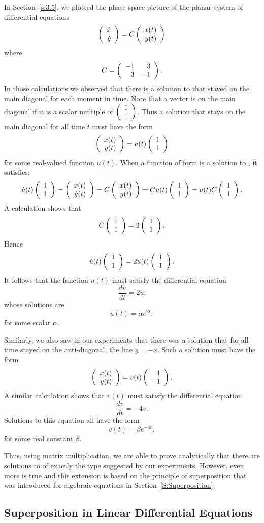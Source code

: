 \documentclass{ximera}
\begin{document}
In Section~\ref{s:3.5}, we plotted the phase space picture 
of the planar system of differential equations
\begin{equation} \label{-13}
\left(\begin{array}{r} \dot{x} \\ \dot{y}\end{array}\right)
= C \left(\begin{array}{r} x(t) \\ y(t)\end{array}\right)
\end{equation}
where
\[
C = \left(\begin{array}{rr} -1 & 3\\ 3 &-1\end{array}\right).
\]
In those calculations we observed that there is a solution to
 that stayed on the main diagonal for each moment in
time.  Note that a vector is on the main diagonal if it is a
scalar multiple of $\left(\begin{array}{r} 1 \\ 1\end{array}\right)$.  Thus a solution that stays
on the main diagonal for all time $t$ must have the form
\begin{equation} \label{e:diagform}
\left(\begin{array}{r} x(t) \\ y(t)\end{array}\right) = u(t) \left(\begin{array}{r} 1 \\ 1\end{array}\right)
\end{equation}
for some real-valued function $u(t)$.  When a function of form
 is a solution to , it satisfies:
\[
\dot{u}(t)\left(\begin{array}{r} 1 \\ 1\end{array}\right) = \left(\begin{array}{r} \dot{x}(t) \\ \dot{y}(t)\end{array}\right) =
C \left(\begin{array}{r} x(t) \\ y(t)\end{array}\right) = C u(t)\left(\begin{array}{r} 1 \\ 1\end{array}\right) = u(t) C \left(\begin{array}{r} 1 \\ 1\end{array}\right).
\]
A calculation shows that
\[
C \left(\begin{array}{r} 1 \\ 1\end{array}\right) = 2 \left(\begin{array}{r} 1 \\ 1\end{array}\right).
\]
Hence
\[
\dot{u}(t) \left(\begin{array}{r} 1 \\ 1\end{array}\right) =  2 u(t) \left(\begin{array}{r} 1 \\ 1\end{array}\right).
\]
It follows that the function $u(t)$ must satisfy the
differential equation
\[
\frac{du}{dt} = 2u.
\]
whose solutions are
\[
u(t) = \alpha e^{2t},
\]
for some scalar $\alpha$.

Similarly, we also saw in our \Matlab experiments that there was
a solution that for all time stayed on the anti-diagonal, the
line $y=-x$.  Such a solution must have the form
\[
\left(\begin{array}{r} x(t) \\ y(t)\end{array}\right) = v(t) \left(\begin{array}{r} 1 \\ -1\end{array}\right).
\]
A similar calculation shows that $v(t)$ must satisfy the
differential equation
\[
\frac{dv}{dt} = -4v.
\]
Solutions to this equation all have the form
\[
v(t) = \beta e^{-4t},
\]
for some real constant $\beta$.

Thus, using matrix multiplication, we are able to prove
analytically that there are solutions to  of exactly
the type suggested by our \Matlab experiments.  However, even
more is true and this extension is based on the principle of 
superposition that was introduced for algebraic equations in 
Section~\ref{S:Superposition}.  

\subsection*{Superposition in Linear Differential Equations}
\end{document}
